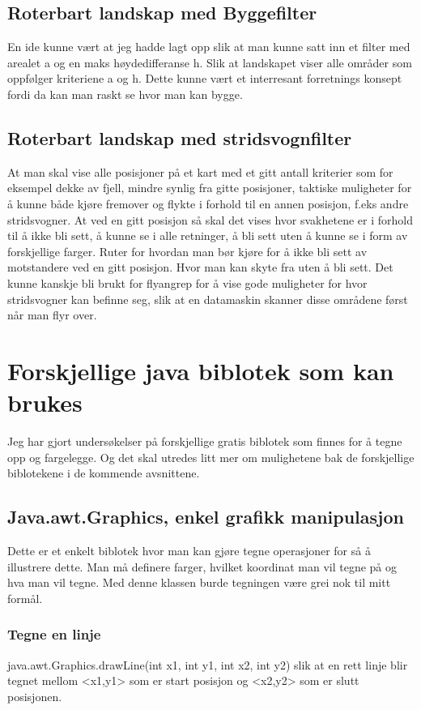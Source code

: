 \documentclass[norsk]{article}
\begin{document}
\subsection{Roterbart landskap med Byggefilter}
En ide kunne vært at jeg hadde lagt opp slik at man kunne satt inn
et filter med arealet a og en maks høydedifferanse h. 
Slik at landskapet viser alle områder som oppfølger kriteriene a og h. 
Dette kunne vært et interresant forretnings konsept fordi da kan man raskt se hvor man kan bygge.

\subsection{Roterbart landskap med stridsvognfilter}
At man skal vise alle posisjoner på et kart med et gitt antall kriterier som
for eksempel dekke av fjell, mindre synlig fra gitte posisjoner, taktiske
muligheter for å kunne både kjøre fremover og flykte i forhold til en annen 
posisjon, f.eks andre stridsvogner.
At ved en gitt posisjon så skal det vises hvor svakhetene er i forhold til å
ikke bli sett, å kunne se i alle retninger, å bli sett uten å kunne se i form
av forskjellige farger. Ruter for hvordan man bør kjøre for å ikke bli sett
av motstandere ved en gitt posisjon. Hvor man kan skyte fra uten å bli sett.
Det kunne kanskje bli brukt for flyangrep for å vise gode muligheter for
hvor stridsvogner kan befinne seg, slik at en datamaskin skanner disse 
områdene først når man flyr over. 

\section{Forskjellige java biblotek som kan brukes}
Jeg har gjort undersøkelser på forskjellige gratis biblotek som finnes for
å tegne opp og fargelegge. Og det skal utredes litt mer om mulighetene bak
de forskjellige biblotekene i de kommende avsnittene.

\subsection{Java.awt.Graphics, enkel grafikk manipulasjon}
Dette er et enkelt biblotek hvor man kan gjøre tegne operasjoner for så å
illustrere dette. Man må definere farger, hvilket koordinat man vil tegne
på og hva man vil tegne. Med denne klassen burde tegningen være grei nok
til mitt formål.

\subsubsection{Tegne en linje}
java.awt.Graphics.drawLine(int x1, int y1, int x2, int y2) slik at en rett
linje blir tegnet mellom <x1,y1> som er start posisjon og <x2,y2> som er 
slutt posisjonen.
\end{document}
